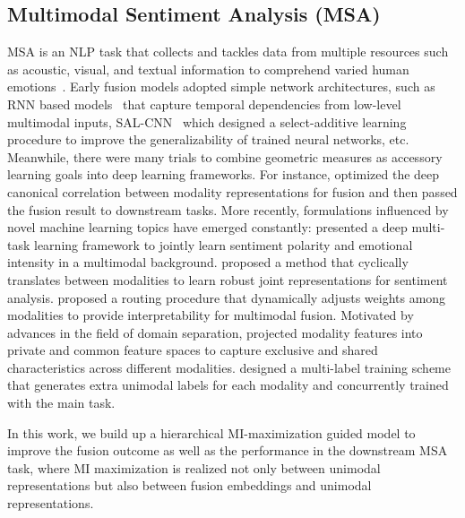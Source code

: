 \documentclass[11pt]{article}
\newcommand{\mv}{visual}
\newcommand{\ma}{acoustic}
\begin{document}
\subsection{Multimodal Sentiment Analysis (MSA)}
MSA is an NLP task that collects and tackles data from multiple resources such as \ma, \mv, and textual information to comprehend varied human emotions~\citep{morency2011towards}.
Early fusion models adopted simple network architectures, such as RNN based models~\citep{wollmer2013youtube,chen2017multimodal} that capture temporal dependencies from low-level multimodal inputs, SAL-CNN~\citep{wang2017select} which designed a select-additive learning procedure to improve the generalizability of trained neural networks, etc. 
Meanwhile, there were many trials to combine geometric measures as accessory learning goals into deep learning frameworks.
For instance, \citet{hazarika2018cascade, sun2020learning} optimized the deep canonical correlation between modality representations for fusion and then passed the fusion result to downstream tasks.
More recently, formulations influenced by novel machine learning topics have emerged constantly:
\citet{akhtar2019multi} presented a deep multi-task learning framework to jointly learn sentiment polarity and emotional intensity in a multimodal background.
\citet{pham2019found} proposed a method that cyclically translates between modalities to learn robust joint representations for sentiment analysis. 
\citet{tsai2020multimodal} proposed a routing procedure that dynamically adjusts weights among modalities to provide interpretability for multimodal fusion.
Motivated by advances in the field of domain separation, \citet{hazarika2020misa} projected modality features into private and common feature spaces to capture exclusive and shared characteristics across different modalities.
\citet{yu2021learning} designed a multi-label training scheme that generates extra unimodal labels for each modality and concurrently trained with the main task.
\par
In this work, we build up a hierarchical MI-maximization guided model to improve the fusion outcome as well as the performance in the downstream MSA task, where MI maximization is realized not only between unimodal representations but also between fusion embeddings and unimodal representations.
\end{document}
